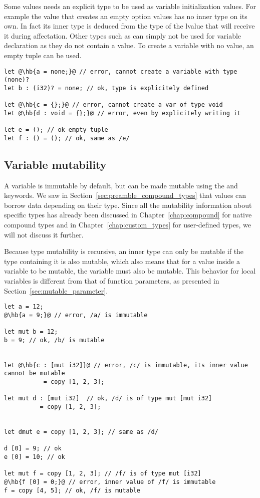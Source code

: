 Some values needs an explicit type to be used as variable initialization values. For example the value  that creates an empty option values has no inner type on its own. In fact its inner type is deduced from the type of the lvalue that will receive it during affectation. Other types such as  can simply not be used for variable declaration as they do not contain a value. To create a variable with no value, an empty tuple \token{()} can be used.

\begin{lstlisting}[style=coloredverbatim, escapechar=@]
let @\hb{a = none;}@ // error, cannot create a variable with type (none)?
let b : (i32)? = none; // ok, type is explicitely defined

let @\hb{c = {};}@ // error, cannot create a var of type void
let @\hb{d : void = {};}@ // error, even by explicitely writing it

let e = (); // ok empty tuple
let f : () = (); // ok, same as /e/
\end{lstlisting}

\subsection {Variable mutability}

A variable is immutable by default, but can be made mutable using the
 and  keywords. We saw in
Section~\ref{sec:preamble_compound_types} that values can borrow data depending
on their type. Since all the mutability information about specific types has
already been discussed in Chapter~\ref{chap:compound} for native compound types
and in Chapter~\ref{chap:custom_types} for user-defined types, we will not
discuss it further.

Because type mutability is recursive, an inner type can only be mutable if the
type containing it is also mutable, which also means that for a value inside a
variable to be mutable, the variable must also be mutable. This behavior for
local variables is different from that of function parameters, as presented in
Section~\ref{sec:mutable_parameter}.

\begin{lstlisting}[style=coloredverbatim, escapechar=@]
let a = 12;
@\hb{a = 9;}@ // error, /a/ is immutable

let mut b = 12;
b = 9; // ok, /b/ is mutable


let @\hb{c : [mut i32]}@ // error, /c/ is immutable, its inner value cannot be mutable
           = copy [1, 2, 3];

let mut d : [mut i32]  // ok, /d/ is of type mut [mut i32]
          = copy [1, 2, 3];


let dmut e = copy [1, 2, 3]; // same as /d/

d [0] = 9; // ok
e [0] = 10; // ok

let mut f = copy [1, 2, 3]; // /f/ is of type mut [i32]
@\hb{f [0] = 0;}@ // error, inner value of /f/ is immutable
f = copy [4, 5]; // ok, /f/ is mutable
\end{lstlisting}

